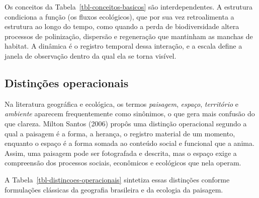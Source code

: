 \documentclass[
  portuguese,
  11pt,
  a4paper,
  open=any]{scrbook}
\begin{document}
Os conceitos da Tabela~\ref{tbl-conceitos-basicos} são interdependentes.
A estrutura condiciona a função (os fluxos ecológicos), que por sua vez
retroalimenta a estrutura ao longo do tempo, como quando a perda de
biodiversidade altera processos de polinização, dispersão e regeneração
que mantinham as manchas de habitat. A dinâmica é o registro temporal
dessa interação, e a escala define a janela de observação dentro da qual
ela se torna visível.

\subsection{Distinções operacionais}\label{sec-distincoes-operacionais}

Na literatura geográfica e ecológica, os termos \emph{paisagem},
\emph{espaço}, \emph{território} e \emph{ambiente} aparecem
frequentemente como sinônimos, o que gera mais confusão do que clareza.
Milton Santos (2006) propôs uma distinção operacional segundo a qual a
paisagem é a forma, a herança, o registro material de um momento,
enquanto o espaço é a forma somada ao conteúdo social e funcional que a
anima. Assim, uma paisagem pode ser fotografada e descrita, mas o espaço
exige a compreensão dos processos sociais, econômicos e ecológicos que
nela operam.

A Tabela~\ref{tbl-distincoes-operacionais} sintetiza essas distinções
conforme formulações clássicas da geografia brasileira e da ecologia da
paisagem.
\end{document}
